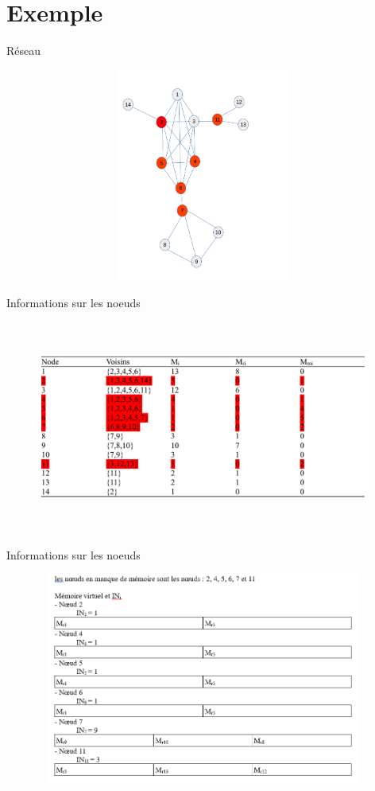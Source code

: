 \documentclass[10pt, c]{beamer}
\begin{document}
\section{Exemple}
	\begin{frame}{Réseau}
	    \begin{figure}
        \centering
       	\includegraphics[width=11cm,height=7cm]{images/ExampleR.PNG}
    \end{figure}
	\end{frame}
    \begin{frame}{Informations sur les noeuds}
         \begin{figure}
        \centering
       	\includegraphics[width=11cm,height=7cm]{images/ExampleTable.PNG}
    \end{figure}        
    \end{frame}
     \begin{frame}{Informations sur les noeuds}
         \begin{figure}
        \centering
       	\includegraphics[width=11cm,height=7cm]{images/templateMemoryexample.PNG}
    \end{figure}       
    \end{frame}
\end{document}
